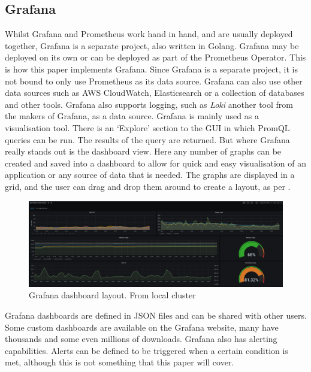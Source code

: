 \subsection{Grafana}
\label{sec:grafana}
Whilst Grafana and Prometheus work hand in hand, and are usually deployed together, Grafana is a separate project, also written in Golang.
Grafana may be deployed on its own or can be deployed as part of the Prometheus Operator. This is how this paper implements Grafana.
Since Grafana is a separate project, it is not bound to only use Prometheus as its data source. Grafana can also use other data sources such as
AWS CloudWatch, Elasticsearch or a collection of databases and other tools\autocite{DataSources}. Grafana also supports logging, such as
\emph{Loki} another tool from the makers of Grafana, as a data source.
\bigbreak
Grafana is mainly used as a visualisation tool. There is an `Explore' section to the GUI in which PromQL queries can be run. The results of the
query are returned. But where Grafana really stands out is the dashboard view. Here any number of graphs can be created and saved into a dashboard
to allow for quick and easy visualisation of an application or any source of data that is needed. The graphs are displayed in a grid, and the
user can drag and drop them around to create a layout, as per .
\begin{figure}[H]
	\centering
	\includegraphics[width=1\linewidth]{figures/grafana_dashboard_kube_node.png}
	\caption{Grafana dashboard layout. From local cluster}
	\label{fig:grafana_dashboard_kube_node}
\end{figure}
Grafana dashboards are defined in JSON files and can be shared with other users. Some custom dashboards are available on the Grafana website,
many have thousands and some even millions of downloads.
\bigbreak
Grafana also has alerting capabilities. Alerts can be defined to be triggered when a certain condition is met, although this is not something
that this paper will cover.
